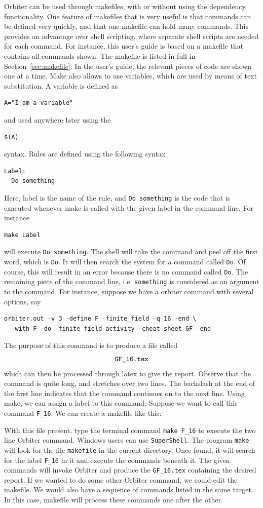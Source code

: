 \bigskip


Orbiter can be used through makefiles, with or without using the dependency functionality.
One feature of makefiles that is very useful is that commands can be defined very quickly, 
and that one makefile can hold many commands. 
This provides an advantage over shell scripting, 
where separate shell scripts are needed for each command.
For instance, this user's guide is based on a makefile that contains all commands shown. 
The makefile is listed in full in Section~\ref{sec:makefile}.
In the user's guide, the relevant pieces of code are shown one at a time.
Make also allows to use variables, which are used by means of text substitution.
A variable 
is defined as 
\begin{verbatim}
A="I am a variable"
\end{verbatim}
and used anywhere later using the 
\begin{verbatim}
$(A)
\end{verbatim}
syntax. 
Rules are defined using the following syntax
\begin{verbatim}
Label:
  Do something
\end{verbatim}
Here, label is the name of the rule, and \verb'Do something' is the code that is exacuted whenever make is called 
with the given label in the command line. For instance
\begin{verbatim}
make Label
\end{verbatim}
will execute \verb'Do something'. 
The shell will take the command and peel off the first word, which is \verb'Do'. It will then search the 
system for a command called \verb'Do'.  Of course, this will result in an error because there is no command called \verb'Do'.
The remaining piece of the command line, i.e. \verb'something' is considered as an argument to the command. 
For instance, suppose we have a orbiter command with several options, say 
\begin{verbatim}
orbiter.out -v 3 -define F -finite_field -q 16 -end \
  -with F -do -finite_field_activity -cheat_sheet_GF -end
\end{verbatim}
The purpose of this command is to produce a file called 
$$
\verb'GF_16.tex'
$$ 
which can then be processed through latex to give the report. 
Observe that the command is quite long, and stretches over two lines. 
The backslash at the end of the first line indicates that the command continues on to the next line.
Using make, we can assign a label to this command. 
Suppose we want to call this command \verb'F_16'.
We can create a makefile like this:
{\tt

}
With this file present, type the terminal command \verb'make F_16' to 
execute the two line Orbiter command.
Windows users can use \verb'SuperShell'.
The program \verb'make' will look for the file \verb'makefile' in the current directory.
Once found, it will search for the label \verb'F_16' in it and execute the commands beneath it.
The given commands will invoke Orbiter and produce the \verb'GF_16.tex' containing the desired report.
If we wanted to do some other Orbiter command, 
we could edit the makefile. 
We would also have a sequence of commands listed in the same target. 
In this case, makefile will process these commands one after the other.


